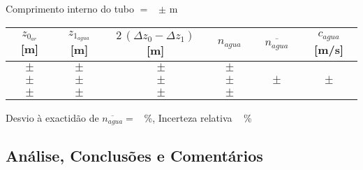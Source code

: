 \documentclass[a4paper,12pt]{article}  %
\begin{document}
\noindent Comprimento interno do tubo $=$~\underline{\makebox[1cm][r]{~}} $\pm$ \underline{\makebox[1cm][r]{~}} m  

\begin{center}
	\begin{tabular}{|c|c|c|c|c|c|}
	\hline
	 $z_{0_{ar}}$  [m]   &  $z_{1_{agua}}$  [m] & $2\,(\Delta z_0- \Delta z_1 )$ [m] & $n_{agua}$  & $\overline{n_{agua}}$ & $c_{agua}$ [m/s]\\
	\hline \hline
	 $ \quad \pm \quad $  & $ \quad \pm \quad $  & $ \quad \pm $ & $ \quad \pm \quad $ &  & \\ \cline{1-4}
	  $ \quad \pm \quad $& $ \quad \pm \quad $ & $ \quad \pm $ & $ \quad \pm \quad$ & $ \quad \pm \quad$  & $ \quad \pm \quad$ \\ \cline{1-4}
	  $ \quad \pm \quad $ & $ \quad \pm \quad $ & $ \quad \pm $ & $ \quad \pm \quad $ &  & \\ \hline
			\end{tabular}
\end{center}

\noindent Desvio à exactidão de $\overline{n_{agua}} =$~\underline{\makebox[1cm][r]{~}} \%, 
 Incerteza relativa ~\underline{\makebox[1cm][r]{~}} \%




\subsection{\sf Análise, Conclusões e Comentários}
\noindent\underline{\makebox[\textwidth][r]{~}} \\
\noindent\underline{\makebox[\textwidth][r]{~}} \\
\noindent\underline{\makebox[\textwidth][r]{~}} \\
\noindent\underline{\makebox[\textwidth][r]{~}} \\
\noindent\underline{\makebox[\textwidth][r]{~}} \\
\noindent\underline{\makebox[\textwidth][r]{~}} \\
\noindent\underline{\makebox[\textwidth][r]{~}} \\
\noindent\underline{\makebox[\textwidth][r]{~}} \\
\noindent\underline{\makebox[\textwidth][r]{~}} \\
\noindent\underline{\makebox[\textwidth][r]{~}} \\
\noindent\underline{\makebox[\textwidth][r]{~}} \\
\noindent\underline{\makebox[\textwidth][r]{~}} \\
\noindent\underline{\makebox[\textwidth][r]{~}} \\
\noindent\underline{\makebox[\textwidth][r]{~}} \\
\noindent\underline{\makebox[\textwidth][r]{~}} \\




\end{document}
